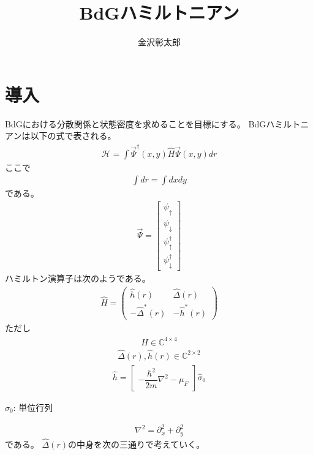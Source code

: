 \documentclass{jarticle}
\begin{document}
\title{BdGハミルトニアン}
\author{金沢彰太郎}
\maketitle

\tableofcontents
\newpage
\section{導入}
BdGにおける分散関係と状態密度を求めることを目標にする。
BdGハミルトニアンは以下の式で表される。
\begin{align}
\mathcal{H}=\int\vec{\Psi}^\dagger(x,y)\hat{H}\vec{\Psi}(x,y)dr
\end{align}
ここで
\begin{align}
\int{dr}=\int{dxdy}
\end{align}
である。
\begin{align}
\vec{\Psi}=\begin{bmatrix}
\psi_{\uparrow} \\
\psi_{\downarrow} \\
\psi_{\uparrow}^\dagger \\
\psi_{\downarrow}^\dagger
\end{bmatrix}
\end{align}
ハミルトン演算子は次のようである。
\begin{align}
\hat{H}=
\begin{pmatrix}
\hat{h}(r) & \hat{\Delta}(r) \\
-\hat{\Delta}^{*}(r) & -\hat{h}^{*}(r)
\end{pmatrix}
\end{align}
ただし
\begin{align}
\hat{H}\in\mathbb{C}^{4\times 4}
\end{align}
\begin{align}
\hat{\Delta}(r),\hat{h}(r)\in\mathbb{C}^{2\times 2}
\end{align}
\begin{align}
\hat{h}=
\begin{bmatrix}
-\dfrac{\hbar^2}{2m}\nabla^2-\mu_F
\end{bmatrix}
\hat{\sigma}_0
\end{align}
\begin{flushright}
	$\hat{\sigma}_0$: 単位行列
\end{flushright}
\begin{align}
\nabla^2=\partial_x^2+\partial_y^2	
\end{align}
である。
$\hat{\Delta}(r)$の中身を次の三通りで考えていく。
\end{document}
